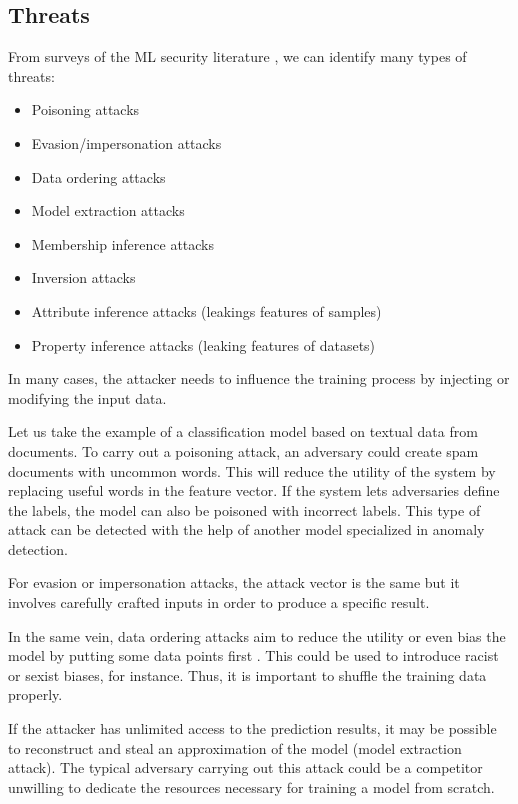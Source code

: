 \documentclass[a4paper,11pt,oneside]{report}
\begin{document}
\subsection{Threats}\label{sec:threats}

From surveys of the ML security literature \cite{liu_survey_2018, rigaki_survey_2021}, we can identify many types of threats:

\begin{itemize}
    \item Poisoning attacks
    \item Evasion/impersonation attacks
    \item Data ordering attacks
    \item Model extraction attacks
    \item Membership inference attacks
    \item Inversion attacks
    \item Attribute inference attacks (leakings features of samples)
    \item Property inference attacks (leaking features of datasets)
\end{itemize}

In many cases, the attacker needs to influence the training process by injecting or modifying the input data.

Let us take the example of a classification model based on textual data from documents. 
To carry out a poisoning attack, an adversary could create spam documents with uncommon words. 
This will reduce the utility of the system by replacing useful words in the feature vector. 
If the system lets adversaries define the labels, the model can also be poisoned with incorrect labels. 
This type of attack can be detected with the help of another model specialized in anomaly detection.

For evasion or impersonation attacks, the attack vector is the same but it involves carefully crafted inputs in order to produce a specific result. 

In the same vein, data ordering attacks aim to reduce the utility or even bias the model by putting some data points first \cite{shumailov_manipulating_2021}. 
This could be used to introduce racist or sexist biases, for instance. Thus, it is important to shuffle the training data properly.

If the attacker has unlimited access to the prediction results, it may be possible to reconstruct and steal an approximation of the model (model extraction attack). 
The typical adversary carrying out this attack could be a competitor unwilling to dedicate the resources necessary for training a model from scratch.
\end{document}
